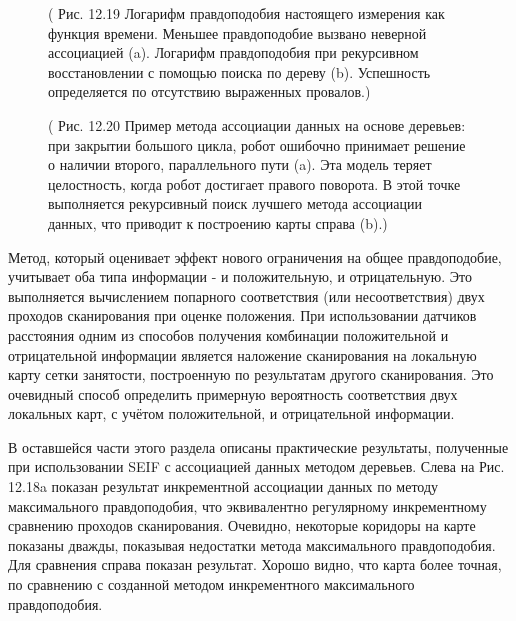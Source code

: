 \documentclass[10pt,a4paper]{article}
\begin{document}
\begin{figure}[H]
	\caption{ ( Рис. 12.19  Логарифм правдоподобия настоящего измерения как функция времени.  Меньшее правдоподобие вызвано неверной ассоциацией (a). Логарифм правдоподобия при рекурсивном восстановлении с помощью поиска по дереву (b). Успешность определяется по отсутствию выраженных провалов.) }
	\label{fig:1219orig}
\end{figure}

\begin{figure}[H]
	\caption{ ( Рис. 12.20 Пример метода ассоциации данных на основе деревьев:  при закрытии большого цикла, робот ошибочно принимает решение о наличии второго, параллельного пути (a). Эта модель теряет целостность, когда робот достигает правого поворота. В этой точке выполняется рекурсивный поиск лучшего метода ассоциации данных, что приводит к построению карты справа (b).) }
	\label{fig:1220orig}
\end{figure}

Метод, который оценивает эффект нового ограничения на общее правдоподобие, учитывает оба типа информации - и положительную, и отрицательную. Это выполняется вычислением попарного соответствия (или несоответствия) двух проходов сканирования при оценке положения. При использовании датчиков расстояния одним из способов получения комбинации положительной и отрицательной информации является наложение сканирования на локальную карту сетки занятости, построенную по результатам другого сканирования. Это очевидный способ определить примерную вероятность соответствия двух локальных карт, с учётом положительной, и отрицательной информации.

В оставшейся части этого раздела описаны практические результаты, полученные при использовании SEIF с ассоциацией данных методом деревьев. Слева на Рис. 12.18a показан результат инкрементной ассоциации данных по методу максимального правдоподобия, что эквивалентно регулярному инкрементному сравнению проходов сканирования. Очевидно, некоторые коридоры на карте показаны дважды, показывая недостатки метода максимального правдоподобия. Для сравнения справа показан результат.  Хорошо видно, что карта более точная, по сравнению с созданной методом инкрементного максимального правдоподобия.
\end{document}
